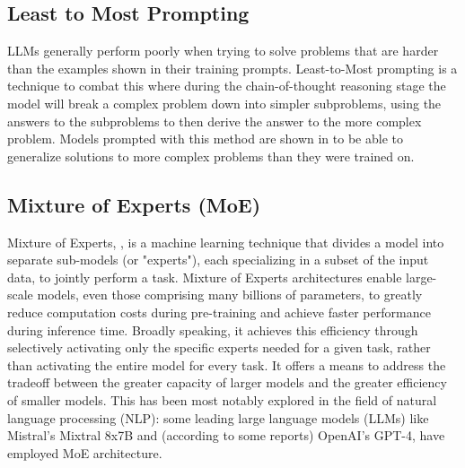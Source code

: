 \subsection{Least to Most Prompting}

LLMs generally perform poorly when trying to solve problems that are harder than the examples shown in their training prompts. Least-to-Most \citet{zhou2023leasttomostpromptingenablescomplex} prompting is a technique to combat this where during the chain-of-thought reasoning stage the model will break a complex problem down into simpler subproblems, using the answers to the subproblems to then derive the answer to the more complex problem. Models prompted with this method are shown in \cite{zhou2023leasttomostpromptingenablescomplex} to be able to generalize solutions to more complex problems than they were trained on.

\subsection{Mixture of Experts (MoE)}
Mixture of Experts, \citet{jacobs1991adaptivemixtureoflocalexperts}, is a machine learning technique that divides a model into separate sub-models (or "experts"), each specializing in a subset of the input data, to jointly perform a task. Mixture of Experts architectures enable large-scale models, even those comprising many billions of parameters, to greatly reduce computation costs during pre-training and achieve faster performance during inference time. Broadly speaking, it achieves this efficiency through selectively activating only the specific experts needed for a given task, rather than activating the entire model for every task. It offers a means to address the tradeoff between the greater capacity of larger models and the greater efficiency of smaller models. This has been most notably explored in the field of natural language processing (NLP): some leading large language models (LLMs) like Mistral’s Mixtral 8x7B and (according to some reports) OpenAI’s GPT-4, have employed MoE architecture.